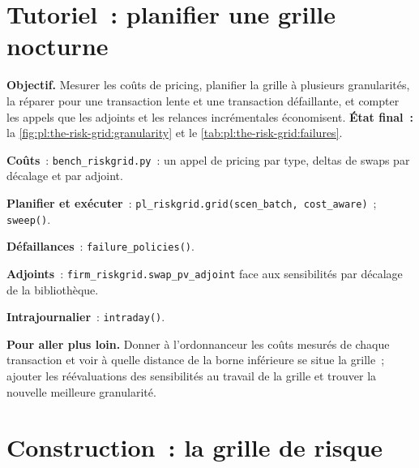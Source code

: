 \section{Tutoriel~: planifier une grille nocturne}\label{tut:pl:the-risk-grid:tut}

\begin{tutorial}
\textbf{Objectif.} Mesurer les coûts de pricing, planifier la grille à plusieurs granularités, la réparer pour une transaction lente et une transaction défaillante, et compter les appels
que les adjoints et les relances incrémentales économisent. \textbf{État final~:} la \cref{fig:pl:the-risk-grid:granularity} et le \cref{tab:pl:the-risk-grid:failures}.
\begin{tutsteps}
\item \textbf{Coûts}~: \texttt{bench\_riskgrid.py}~: un appel de pricing par type, deltas de swaps par décalage et par adjoint.
\item \textbf{Planifier et exécuter}~: \texttt{pl\_riskgrid.grid(scen\_batch, cost\_aware)}~; \texttt{sweep()}.
\item \textbf{Défaillances}~: \texttt{failure\_policies()}.
\item \textbf{Adjoints}~: \texttt{firm\_riskgrid.swap\_pv\_adjoint} face aux sensibilités par décalage de la bibliothèque.
\item \textbf{Intrajournalier}~: \texttt{intraday()}.
\end{tutsteps}
\textbf{Pour aller plus loin.} Donner à l'ordonnanceur les coûts mesurés de chaque transaction et voir à quelle distance de la borne inférieure se situe la grille~;
ajouter les réévaluations des sensibilités au travail de la grille et trouver la nouvelle meilleure granularité.
\end{tutorial}

\section{Construction~: la grille de risque}\label{bld:pl:the-risk-grid:riskgrid}

